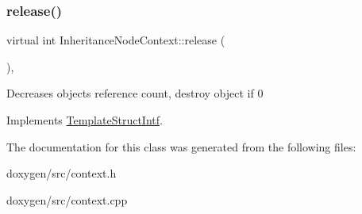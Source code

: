 \mbox{\label{class_inheritance_node_context_a37fa7b0204b7762070d886d5c1655b8f}} 
\subsubsection{\texorpdfstring{release()}{release()}}
{\footnotesize\ttfamily virtual int Inheritance\+Node\+Context\+::release (\begin{DoxyParamCaption}{ }\end{DoxyParamCaption})\hspace{0.3cm}{\ttfamily [inline]}, {\ttfamily [virtual]}}

Decreases object\textquotesingle{}s reference count, destroy object if 0 

Implements \mbox{\hyperlink{class_template_struct_intf_a3dce7dd29d3f66a8080b40578e8a5045}{Template\+Struct\+Intf}}.



The documentation for this class was generated from the following files\+:\begin{DoxyCompactItemize}
\item 
doxygen/src/context.\+h\item 
doxygen/src/context.\+cpp\end{DoxyCompactItemize}
